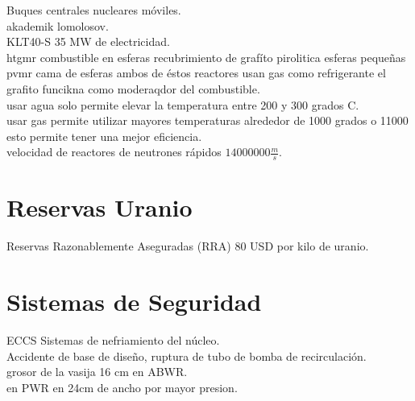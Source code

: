\documentclass[]{article}
\begin{document}
Buques centrales nucleares móviles.\\

akademik lomolosov.\\

KLT40-S 35 MW de electricidad.\\

htgmr combustible en esferas recubrimiento de grafíto pirolitica esferas pequeñas
pvmr cama de esferas ambos de éstos reactores usan gas como refrigerante
el grafito funcikna como moderaqdor del combustible.\\

usar agua solo permite elevar la temperatura entre 200 y 300 grados C.\\

usar gas permite utilizar mayores temperaturas alrededor de 1000 grados o 11000
esto permite tener una mejor eficiencia.\\

velocidad de reactores de neutrones rápidos $14 000 000  \frac{m}{s}$.\\

\section{Reservas Uranio}

Reservas Razonablemente Aseguradas (RRA) 80 USD por kilo de uranio.\\

\section{Sistemas de Seguridad}

ECCS Sistemas de nefriamiento del núcleo.\\
Accidente de base de diseño, ruptura de tubo de bomba de recirculación.\\
grosor de la vasija 16 cm en ABWR.\\
en PWR en 24cm de ancho por mayor presion.\\




%
%
\end{document}
